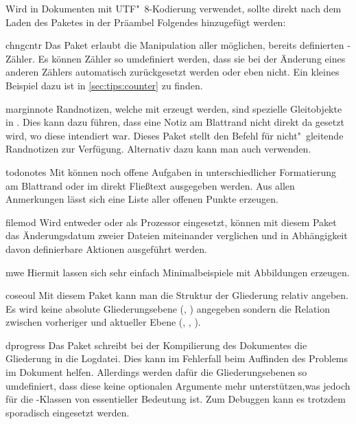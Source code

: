 \begin{packages}
  Wird  in Dokumenten mit UTF"~8-Kodierung verwendet, sollte 
  direkt nach dem Laden des Paketes in der Präambel Folgendes hinzugefügt 
  werden:
  \begin{Code}
  \end{Code}\vspace{-\baselineskip}%
\item[chngcntr]
  Das Paket erlaubt die Manipulation aller möglichen, bereits definierten 
  -Zähler. Es können Zähler so umdefiniert werden, dass sie bei 
  der Änderung eines anderen Zählers automatisch zurückgesetzt werden oder eben 
  nicht. Ein kleines Beispiel dazu ist in \autoref{sec:tips:counter} zu finden.
\item[marginnote]
  Randnotizen, welche mit  erzeugt werden, sind spezielle 
  Gleitobjekte in . Dies kann dazu führen, dass eine Notiz am 
  Blattrand nicht direkt da gesetzt wird, wo diese intendiert war. Dieses Paket 
  stellt den Befehl  für nicht"~gleitende Randnotizen zur 
  Verfügung. Alternativ dazu kann man auch  verwenden.
\item[todonotes]
  Mit  können noch offene Aufgaben in unterschiedlicher 
  Formatierung am Blattrand oder im direkt Fließtext ausgegeben werden. Aus 
  allen Anmerkungen lässt sich eine Liste aller offenen Punkte erzeugen.
\item[filemod]
  Wird entweder  oder  als Prozessor 
  eingesetzt, können mit diesem Paket das Änderungsdatum zweier Dateien 
  miteinander verglichen und in Abhängigkeit davon definierbare Aktionen 
  ausgeführt werden.
\item[mwe]
  Hiermit lassen sich sehr einfach Minimalbeispiele mit Abbildungen erzeugen.
\item[coseoul]
  Mit diesem Paket kann man die Struktur der Gliederung relativ angeben. Es 
  wird keine absolute Gliederungsebene (, ) 
  angegeben sondern die Relation zwischen vorheriger und aktueller Ebene 
  (, , ).
\item[dprogress]
  Das Paket schreibt bei der Kompilierung des Dokumentes die Gliederung in die 
  Logdatei. Dies kann im Fehlerfall beim Auffinden des Problems im Dokument 
  helfen. Allerdings werden dafür die Gliederungsebenen so umdefiniert, dass 
  diese keine optionalen Argumente mehr unterstützen,was jedoch für die 
  \TUDScript-Klassen von essentieller Bedeutung ist. Zum Debuggen kann es 
  trotzdem sporadisch eingesetzt werden.
\end{packages}

